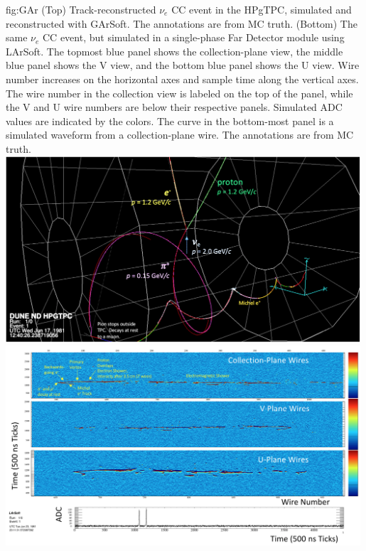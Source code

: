 \begin{dunefigure}{fig:GAr}
{(Top) Track-reconstructed $\nu_e$ CC event in the HPgTPC, simulated and reconstructed with GArSoft.  The annotations are from MC truth. (Bottom) The same $\nu_e$ CC event, but simulated in a single-phase Far Detector module using LArSoft.  The topmost blue panel shows the collection-plane view, the middle blue panel shows the V view, and the bottom blue panel shows the U view.  Wire number increases on the horizontal axes and sample time along the vertical axes.   The wire number in the collection view is labeled on the top of the panel, while the V and U wire numbers are below their respective panels. Simulated ADC values are indicated by the colors.  The curve in the bottom-most panel is a simulated waveform from a collection-plane wire.  The annotations are from MC truth.}
    \includegraphics[width=0.99\textwidth]{graphics/Garsoft_evt.png}
    \includegraphics[width=0.99\textwidth]{graphics/nuenppinliquid.png}
\end{dunefigure}
%
%
